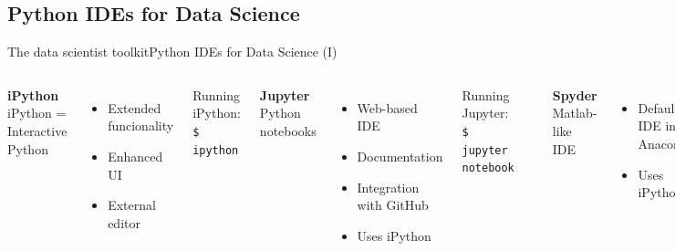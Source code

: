 \documentclass[10pt,compress]{beamer} %
\begin{document}
\subsection{Python IDEs for Data Science}
\begin{frame}{The data scientist toolkit}{Python IDEs for Data Science (I)}
    \begin{columns}[t]
	   \centering \textbf{iPython}\\
	   iPython = Interactive Python
   		\begin{itemize}
		\item Extended funcionality
		\item Enhanced UI
		\item External editor
		\end{itemize}

		Running iPython:\\
		\texttt{\$ ipython}

	   \centering \textbf{Jupyter}\\
		Python notebooks
	\begin{itemize}
		\item Web-based IDE
		\item Documentation
		\item Integration with GitHub
		\item Uses iPython
	\end{itemize}

		Running Jupyter:\\
		\texttt{\$ jupyter notebook}

		\includegraphics[width=0.8\textwidth]{figs/jupyter.png}	

	   \centering \textbf{Spyder}\\
		Matlab-like IDE
		\begin{itemize}
			\item Default IDE in Anaconda
			\item Uses iPython
		\end{itemize}
        \bigskip


\end{columns}
\end{frame}
\end{document}
